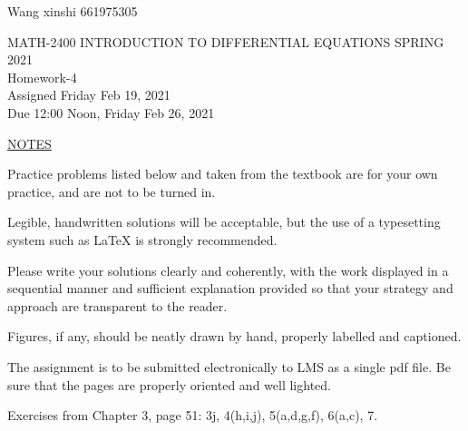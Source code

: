 
\pagestyle{empty}

Wang xinshi 661975305
\begin{center}
\large{ MATH-2400 \hspace{.25in}  INTRODUCTION TO DIFFERENTIAL EQUATIONS \hspace{.25in}SPRING 2021\\ Homework-4   \\ Assigned Friday Feb 19, 2021 \\ Due 12:00 Noon, Friday Feb 26, 2021}\end{center}

\bigskip
\n\ul{NOTES}
\benum
\item 
Practice problems listed below and taken from the textbook are for your own practice, and are not to be turned in.
\item 
Legible, handwritten solutions will be acceptable, but the use of a typesetting system such as LaTeX is strongly recommended.  \nc
\item 
Please write your solutions clearly and coherently, with the work displayed in a sequential manner and sufficient explanation provided so that your strategy and approach are transparent to the reader. 
\item 
Figures, if any, should be neatly drawn by hand, properly labelled and captioned.  
\item 
The assignment is to be submitted electronically to LMS  as a single pdf file.  Be sure that the pages are properly oriented and well lighted.  \nc
\eenum

\bigskip


 \ec

\n Exercises from Chapter 3, page 51: 3j, 4(h,i,j), 5(a,d,g,f), 6(a,c), 7.

\medskip

 \ec

